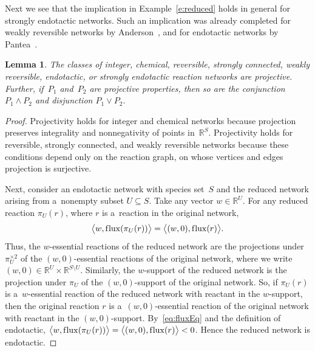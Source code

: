\documentclass[pdftex]{sigma}
\newtheorem{Lemma}[Theorem]{Lemma}
\newcommand{\flux}[1]{\operatorname{f\/lux}(#1)} %
\begin{document}
Next we see that the implication in Example~\ref{e:reduced} holds in general for strongly endotactic networks.
Such an implication was already completed for weakly reversible networks by Anderson~\cite[Lemma 3.4]{Anderson11}, and
for endotactic networks by Pantea~\cite[Proposition 3.1]{Pantea}.
\begin{Lemma}\label{lem:fams_proj_well}
The classes of integer, chemical, reversible, strongly connected, weakly reversible, endotactic, or strongly endotactic
reaction networks are projective.
Further, if~$P_1$ and~$P_2$ are projective properties, then so are the conjunction $P_1\wedge P_2$ and disjunction
$P_1\vee P_2$.
\end{Lemma}
\begin{proof}
Projectivity holds for integer and chemical networks because projection preserves integrality and nonnegativity of
points in~$\mathbb{R}^S$.
Projectivity holds for reversible, strongly connected, and weakly reversible networks because these conditions depend
only on the reaction graph, on whose vertices and edges projection is surjective.

Next, consider an endotactic network with species set~$S$ and the reduced network arising from a~nonempty subset
$U\subseteq S$.
Take any vector $w\in\mathbb{R}^U$.
For any reduced reaction $\pi_U(r)$, where $r$ is a~reaction in the original network,
\begin{gather}
\label{eq:fluxEq}
\big\langle w,\flux{\pi_U(r)}\big\rangle=\big\langle(w,0),\flux{r}\big\rangle.
\end{gather}
Thus, the $w$-essential reactions of the reduced network are the projections under $\pi_U^{\times2}$ of the
$(w,0)$-essential reactions of the original network, where we write $(w,0)\in\mathbb{R}^U\times\mathbb{R}^{S\setminus
U}$.
Similarly, the $w$-support of the reduced network is the projection under $\pi_U$ of the $(w,0)$-support of the
original network.
So, if $\pi_U(r)$ is a~$w$-essential reaction of the reduced network with reactant in the $w$-support, then the
original reaction $r$ is a~$(w,0)$-essential reaction of the original network with reactant in the $(w,0)$-support.
By~\eqref{eq:fluxEq} and the def\/inition of endotactic, $\big\langle
w,\flux{\pi_U(r)}\big\rangle=\big\langle(w,0),\flux{r}\big\rangle<0$.
Hence the reduced network is endotactic.


\end{proof}
\end{document}
